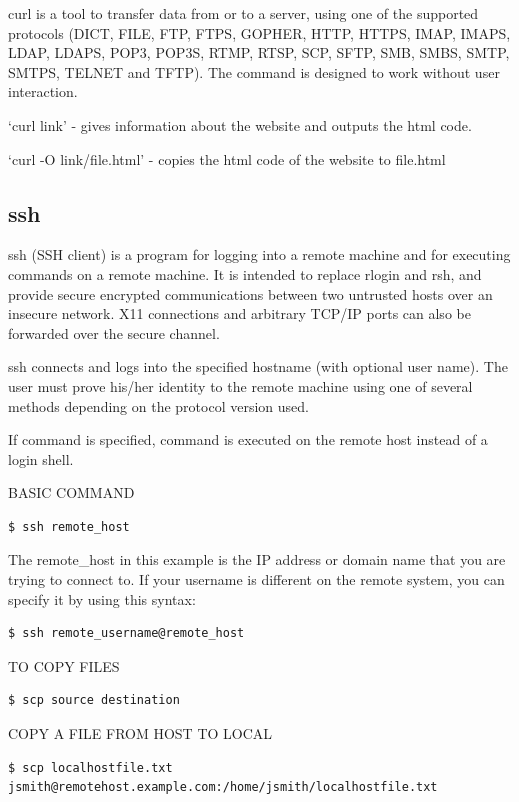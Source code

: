 \documentclass{article}
\begin{document}
curl \cite{curlweb} is a tool to transfer data from or to a server, using one of the supported protocols (DICT, FILE, FTP, FTPS, GOPHER, HTTP, HTTPS, IMAP, IMAPS, LDAP, LDAPS, POP3, POP3S, RTMP, RTSP, SCP, SFTP, SMB, SMBS, SMTP, SMTPS, TELNET and TFTP). The command is designed to work without user interaction.

`curl link' - gives information about the website and outputs the html code.

`curl -O link/file.html' - copies the html code of the website to file.html

\subsection{ssh}

     ssh (SSH client) is a program for logging into a remote machine and for
     executing commands on a remote machine.  It is intended to replace rlogin
     and rsh, and provide secure encrypted communications between two
     untrusted hosts over an insecure network.  X11 connections and arbitrary
     TCP/IP ports can also be forwarded over the secure channel.

     ssh connects and logs into the specified hostname (with optional user
     name).  The user must prove his/her identity to the remote machine using
     one of several methods depending on the protocol version used.

     If command is specified, command is executed on the remote host instead
     of a login shell.
    
BASIC COMMAND

\begin{verbatim}
$ ssh remote_host
\end{verbatim}
\hspace{10mm}The remote\_host in this example is the IP address or domain name that you are trying to connect to.
If your username is different on the remote system, you can specify it by using this syntax:
\begin{verbatim}
$ ssh remote_username@remote_host
\end{verbatim}

TO COPY FILES
\begin{verbatim}
$ scp source destination
\end{verbatim}

COPY A FILE FROM HOST TO LOCAL

\begin{verbatim}
$ scp localhostfile.txt jsmith@remotehost.example.com:/home/jsmith/localhostfile.txt
\end{verbatim}
\end{document}
